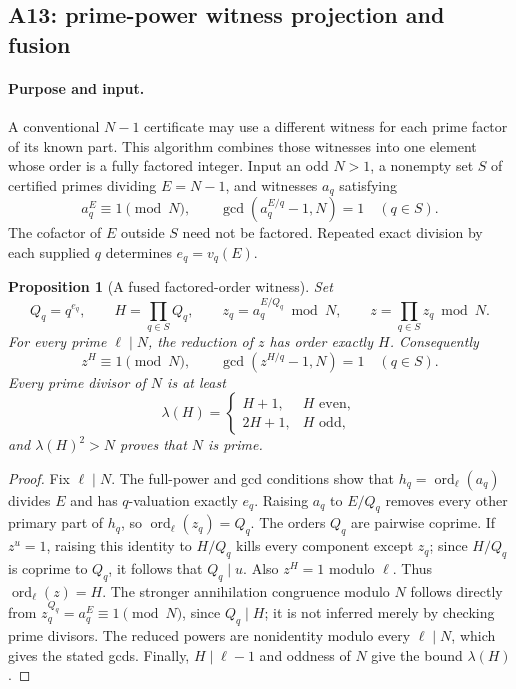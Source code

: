 \documentclass[11pt,a4paper]{article}
\newtheorem{proposition}[theorem]{Proposition}
\theoremstyle{definition}\newtheorem{definition}[theorem]{Definition}
\theoremstyle{remark}\newtheorem{remark}[theorem]{Remark}
\newcommand{\ord}{\operatorname{ord}}\newcommand{\rad}{\operatorname{rad}}
\begin{document}
\subsection{A13: prime-power witness projection and fusion}
\label{alg:A13}

\paragraph{Purpose and input.}
A conventional $N-1$ certificate may use a different witness for each
prime factor of its known part.  This algorithm combines those witnesses
into one element whose order is a fully factored integer.  Input an odd
$N>1$, a nonempty set $S$ of certified primes dividing $E=N-1$, and witnesses
$a_q$ satisfying
\[
 a_q^E\equiv1\pmod N,\qquad
 \gcd(a_q^{E/q}-1,N)=1\quad(q\in S).
\]
The cofactor of $E$ outside $S$ need not be factored.  Repeated exact division
by each supplied $q$ determines $e_q=v_q(E)$.

\begin{proposition}[A fused factored-order witness]\label{prop:cert-fusion}
Set
\[
 Q_q=q^{e_q},\qquad H=\prod_{q\in S}Q_q,\qquad
 z_q=a_q^{E/Q_q}\bmod N,\qquad z=\prod_{q\in S}z_q\bmod N.
\]
For every prime $\ell\mid N$, the reduction of $z$ has order exactly $H$.
Consequently
\[
 z^H\equiv1\pmod N,\qquad
 \gcd(z^{H/q}-1,N)=1\quad(q\in S).
\]
Every prime divisor of $N$ is at least
\[
 \lambda(H)=\begin{cases}H+1,&H\text{ even},\\2H+1,&H\text{ odd},\end{cases}
\]
and $\lambda(H)^2>N$ proves that $N$ is prime.
\end{proposition}

\begin{proof}
Fix $\ell\mid N$.  The full-power and gcd conditions show that
$h_q=\ord_\ell(a_q)$ divides $E$ and has $q$-valuation exactly $e_q$.
Raising $a_q$ to $E/Q_q$ removes every other primary part of $h_q$, so
$\ord_\ell(z_q)=Q_q$.  The orders $Q_q$ are pairwise coprime.  If
$z^u=1$, raising this identity to $H/Q_q$ kills every component except
$z_q$; since $H/Q_q$ is coprime to $Q_q$, it follows that $Q_q\mid u$.
Also $z^H=1$ modulo $\ell$.  Thus $\ord_\ell(z)=H$.  The stronger
annihilation congruence modulo $N$ follows directly from
$z_q^{Q_q}=a_q^E\equiv1\pmod N$, since $Q_q\mid H$; it is not inferred
merely by checking prime divisors.  The reduced powers are nonidentity
modulo every $\ell\mid N$, which gives the stated gcds.  Finally,
$H\mid\ell-1$ and oddness of $N$ give the bound $\lambda(H)$.
\end{proof}
\end{document}
